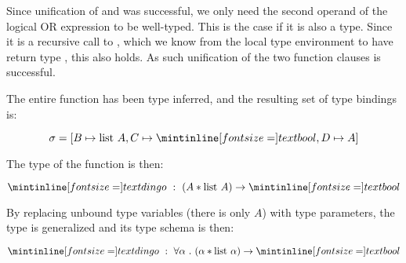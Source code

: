 \bigskip

Since unification of  and  was successful, we only need the second
operand of the logical OR expression to be well-typed. This is the case if it is
also a  type. Since it is a recursive call to , which we know
from the local type environment to have return type , this also holds.
As such unification of the two function clauses is successful.

\bigskip

The entire function has been type inferred, and the resulting set of type
bindings is:

$$
\sigma = [B \mapsto \text{list } A, C \mapsto \ms{bool}, D \mapsto A]
$$

The type of the function is then:

$$
\ms{dingo}\ :\ (A * \text{list } A) \to \ms{bool}
$$


By replacing unbound type variables (there is only $A$) with type parameters,
the type is generalized and its type schema is then:


$$
\ms{dingo}\ :\ \forall \alpha\ .\ (\alpha * \text{list } \alpha) \to \ms{bool}
$$



\Sectend

